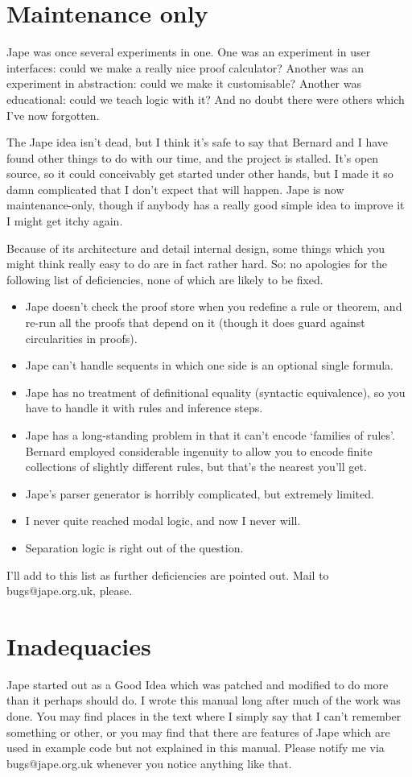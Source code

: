 \section*{Maintenance only}

Jape was once several experiments in one. One was an experiment in user interfaces: could we make a really nice proof calculator? Another was an experiment in abstraction: could we make it customisable? Another was educational: could we teach logic with it? And no doubt there were others which I've now forgotten.

The Jape idea isn't dead, but I think it's safe to say that Bernard and I have found other things to do with our time, and the project is stalled. It's open source, so it could conceivably get started under other hands, but I made it so damn complicated that I don't expect that will happen. Jape is now maintenance-only, though if anybody has a really good simple idea to improve it I might get itchy again.

Because of its architecture and detail internal design, some things which you might think really easy to do are in fact rather hard. So: no apologies for the following list of deficiencies, none of which are likely to be fixed.

\begin{itemize}
\item Jape doesn't check the proof store when you redefine a rule or theorem, and re-run all the proofs that depend on it (though it does guard against circularities in proofs).
\item Jape can't handle sequents in which one side is an optional single formula.
\item Jape has no treatment of definitional equality (syntactic equivalence), so you have to handle it with rules and inference steps.
\item Jape has a long-standing problem in that it can't encode `families of rules'. Bernard employed considerable ingenuity to allow you to encode finite collections of slightly different rules, but that's the nearest you'll get.
\item Jape's parser generator is horribly complicated, but extremely limited.
\item I never quite reached modal logic, and now I never will.
\item Separation logic is right out of the question.
\end{itemize}

I'll add to this list as further deficiencies are pointed out. Mail to bugs@jape.org.uk, please.

\section*{Inadequacies}

Jape started out as a Good Idea which was patched and modified to do more than it perhaps should do. I wrote this manual long after much of the work was done. You may find places in the text where I simply say that I can't remember something or other, or you may find that there are features of Jape which are used in example code but not explained in this manual. Please notify me via bugs@jape.org.uk whenever you notice anything like that.